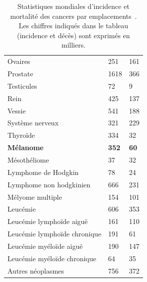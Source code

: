 \begin{table}[H]
\begin{tabular}{lll}
    Ovaires                             & 251               & 161           \\
    Prostate                            & 1618              & 366           \\
    Testicules                          & 72                & 9             \\
    Rein                                & 425               & 137           \\
    Vessie                              & 541               & 188           \\
    Système nerveux                     & 321               & 229           \\
    Thyroïde                            & 334               & 32            \\
    \textbf{Mélanome}                   & \textbf{352}      & \textbf{60}   \\
    Mésothéliome                        & 37                & 32            \\
    Lymphome de Hodgkin                 & 78                & 24            \\
    Lymphome non hodgkinien             & 666               & 231           \\
    Mélyome multiple                    & 154               & 101           \\
    Leucémie                            & 606               & 353           \\
    Leucémie lymphoïde aiguë            & 161               & 110           \\
    Leucémie lymphoïde chronique        & 191               & 61            \\
    Leucémie myéloïde aiguë             & 190               & 147           \\
    Leucémie myéloïde chronique         & 64                & 35            \\
    Autres néoplasmes                   & 756               & 372           \\ \bottomrule
    \end{tabular}   
    \caption{Statistiques mondiales d’incidence et mortalité des cancers par emplacements~\cite{Karimkhani2017}. Les chiffres indiqués dans le tableau (incidence et décès) sont exprimés en milliers.}
    \label{tab:introduction_cancer_incidence}
\end{table}\par

